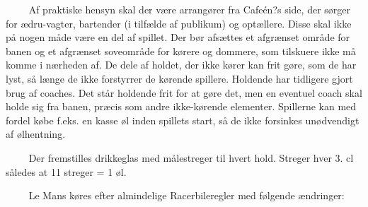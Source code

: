 \documentclass[12pt]{article}
\begin{document}
$\qquad$ Af praktiske hensyn skal der være arrangører fra Cafeén?s side, der sørger for ædru-vagter, bartender (i tilfælde af publikum) og optællere. Disse skal ikke på nogen måde være en del af spillet. Der bør afsættes et afgrænset område for banen og et afgrænset soveområde for kørere og dommere, som tilskuere ikke må komme i nærheden af. De dele af holdet, der ikke kører kan frit gøre, som de har lyst, så længe de ikke forstyrrer de kørende spillere. Holdende har tidligere gjort brug af coaches. Det står holdende frit for at gøre det, men en eventuel coach skal holde sig fra banen, præcis som andre ikke-kørende elementer. Spillerne kan med fordel købe f.eks. en kasse øl inden spillets start, så de ikke forsinkes unødvendigt af ølhentning.

$\qquad$ Der fremstilles drikkeglas med målestreger til hvert hold. Streger hver 3. cl således at 11 streger = 1 øl.

$\qquad$ Le Mans køres efter almindelige Racerbileregler med følgende ændringer:
\end{document}
